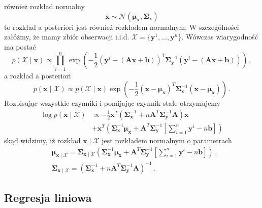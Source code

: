 \documentclass{myclass}
\numberwithin{equation}{subsection}
\begin{document}
również rozkład normalny
\begin{equation}
    \bm{x} \sim \mathcal{N}(\bm{\mu}_{\bm{x}}, \bm{\Sigma}_{\bm{x}})
\end{equation}
to rozkład a posteriori jest również rozkładem normalnym. W szczególności załóżmy, że mamy zbiór
obserwacji i.i.d. \(\mathcal{X} = \{\bm{y}^1, \ldots, \bm{y}^n\}\). Wówczas wiarygodność ma postać
\begin{equation}
    p(\mathcal{X} \mid \bm{x}) \propto \prod_{i=1}^n \exp\left(-\frac{1}{2}(\bm{y}^i - (\bm{Ax}+\bm{b}))^T\bm{\Sigma}_{\bm{y}}^{-1}(\bm{y}^i - (\bm{Ax}+\bm{b}))\right)\,,
\end{equation}
a rozkład a posteriori
\begin{equation}
    p(\bm{x} \mid \mathcal{X}) \propto p(\mathcal{X} \mid \bm{x}) \exp\left(-\frac{1}{2}(\bm{x} - \bm{\mu}_{\bm{x}})^T\bm{\Sigma}_{\bm{x}}^{-1}(\bm{x} - \bm{\mu}_{\bm{x}})\right)\,.
\end{equation}
Rozpisując wszystkie czynniki i pomijając czynnik stałe otrzymujemy
\begin{equation}
    \begin{split}
        \log p(\bm{x} \mid \mathcal{X}) &\propto -\frac{1}{2}\bm{x}^T\left(\bm{\Sigma}_{\bm{x}}^{-1} + n\bm{A}^T\bm{\Sigma}_{\bm{y}}^{-1}\bm{A}\right)\bm{x}\\
        & + \bm{x}^T\left(\bm{\Sigma}_{\bm{x}}^{-1}\bm{\mu}_{\bm{x}} + \bm{A}^T\bm{\Sigma}_{\bm{y}}^{-1}\left[\sum_{i=1}^n\bm{y}^i - n\bm{b}\right]\right)
    \end{split}
\end{equation}
skąd widzimy, iż rozkład \(\bm{x} \mid \mathcal{X}\) jest rozkładem normalnym o parametrach
\begin{equation}\label{eq:linear_gauss}\boxed{
    \begin{split}
        &\bm{\mu}_{\bm{x} \mid \mathcal{X}} = \bm{\Sigma}_{\bm{x} \mid \mathcal{X}} \left(\bm{\Sigma}_{\bm{x}}^{-1}\bm{\mu}_{\bm{x}} + \bm{A}^T\bm{\Sigma}_{\bm{y}}^{-1}\left[\sum_{i=1}^n\bm{y}^i - n\bm{b}\right]\right) \,,\\
        &\bm{\Sigma}_{\bm{x} \mid \mathcal{X}} = \left(\bm{\Sigma}_{\bm{x}}^{-1} + n\bm{A}^T\bm{\Sigma}_{\bm{y}}^{-1}\bm{A}\right)^{-1}\,.
    \end{split}
}\end{equation}


\subsection{Regresja liniowa}
\end{document}
